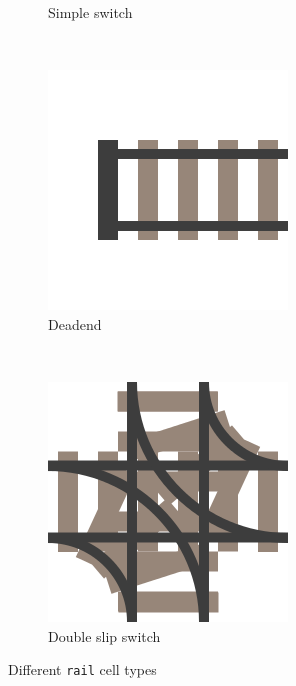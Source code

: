 \documentclass[a4paper,10pt]{report}
\begin{document}
\begin{figure}[h]
\begin{subfigure}[t]{.20\linewidth}
		\caption{Simple switch}
		\label{fig:rail-cell-simple}
	\end{subfigure}%
	~
	\begin{subfigure}[t]{.20\linewidth}
		\includegraphics[width=\textwidth]{deadend-rail.png}
		\caption{Deadend}
		\label{fig:rail-cell-deadend}
	\end{subfigure}%
	~
	\begin{subfigure}[t]{.20\linewidth}
		\includegraphics[width=\textwidth]{double-slip-rail.png}
		\caption{Double slip switch}
		\label{fig:rail-cell-double}
	\end{subfigure}%

	\caption{Different \texttt{rail} cell types}
	\label{fig:rail-cells}
\end{figure}
\end{document}
